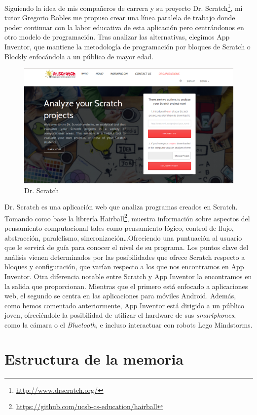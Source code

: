 \documentclass[a4paper, 12pt]{book}
\begin{document}
Siguiendo la idea de mis compañeros de carrera y su proyecto Dr. Scratch\footnote{\url{http://www.drscratch.org/}}, mi tutor Gregorio Robles me propuso crear una línea paralela de trabajo donde poder continuar con la labor educativa de esta aplicación pero centrándonos en otro modelo de programación. Tras analizar las alternativas, elegimos App Inventor, que mantiene la metodología de programación por bloques de Scratch o Blockly enfocándola a un público de mayor edad. 
\begin{figure}[H]
  \centering
  \includegraphics[width=0.70\linewidth, keepaspectratio]{img/DrScratch}
  \caption{Dr. Scratch}
  \label{fig:DrScratch}
\end{figure}
Dr. Scratch es una aplicación web que analiza programas creados en Scratch. Tomando como base la librería Hairball\footnote{\url{https://github.com/ucsb-cs-education/hairball}}, muestra información sobre aspectos del pensamiento computacional tales como pensamiento lógico, control de flujo, abstracción, paralelismo, sincronización\ldots Ofreciendo una puntuación al usuario que le servirá de guía para conocer el nivel de su programa. Los puntos clave del análisis vienen determinados por las posibilidades que ofrece Scratch respecto a bloques y configuración, que varían respecto a los que nos encontramos en App Inventor. 
Otra diferencia notable entre Scratch y App Inventor la encontramos en la salida que proporcionan. Mientras que el primero está enfocado a aplicaciones web, el segundo se centra en las aplicaciones para móviles Android. Además, como hemos comentado anteriormente, App Inventor está dirigido a un público joven, ofreciéndole la posibilidad de utilizar el hardware de sus \emph{smartphones}, como la cámara o el \emph{Bluetooth}, e incluso interactuar con robots Lego Mindstorms.

\section{Estructura de la memoria}
\label{sec:estructura}
\end{document}
